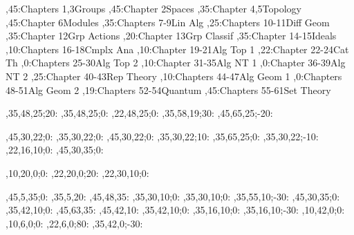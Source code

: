 
\setcounter{diagheight}{50}
\begin{chart}
,45:{Chapters 1,3}{Groups}{}
,45:{Chapter 2}{Spaces}{}
,35:{Chapter 4,5}{Topology}{}
,45:{Chapter 6}{Modules}{}
,35:{Chapters 7-9}{Lin Alg}{}
,25:{Chapters 10-11}{Diff Geom}{}
,35:{Chapter 12}{Grp Actions}{}
,20:{Chapter 13}{Grp Classif}{}
,35:{Chapter 14-15}{Ideals}{}
,10:{Chapters 16-18}{Cmplx Ana}{}
,10:{Chapter 19-21}{Alg Top 1}{}
,22:{Chapter 22-24}{Cat Th}{}
,0:{Chapters 25-30}{Alg Top 2}{}
,10:{Chapter 31-35}{Alg NT 1}{}
,0:{Chapter 36-39}{Alg NT 2}{}
,25:{Chapter 40-43}{Rep Theory}{}
,10:{Chapters 44-47}{Alg Geom 1}{}
,0:{Chapters 48-51}{Alg Geom 2}{}
,19:{Chapters 52-54}{Quantum}{}
,45:{Chapters 55-61}{Set Theory}{}

,35,48,25;20:  %
,35,48,25;0:   %
,22,48,25;0:   %
,35,58,19;30:  %
,45,65,25;-20: %

,45,30,22;0:   %
,35,30,22;0:   %
,45,30,22;0:   %
,35,30,22;10:  %
,35,65,25;0:   %
,35,30,22;-10: %
,22,16,10;0:   %
,45,30,35;0:   %

,10,20,0;0:    %
,22,20,0;20:   %
,22,30,10;0:   %

,45,5,35;0:    %
,35,5,20:      %
,45,48,35:     %
,35,30,10;0:   %
,35,30,10;0:   %
,35,55,10;-30: %
,45,30,35;0:   %
,35,42,10;0:   %
,45,63,35:     %
,45,42,10:     %
,35,42,10;0:   %
,35,16,10;0:   %
,35,16,10;-30: %
,10,42,0;0:    %
,10,6,0;0:     %
,22,6,0;80:     %
,35,42,0;-30:  %
\end{chart}
